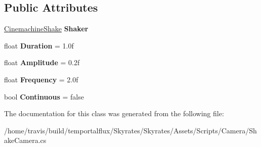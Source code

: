 \subsection*{Public Attributes}
\begin{DoxyCompactItemize}
\item 
\hypertarget{class_skyrates_1_1_cinemachine_1_1_shake_camera_a939864f39c7e4a3e9005db8f09e441dc}{\hyperlink{class_skyrates_1_1_cinemachine_1_1_cinemachine_shake}{Cinemachine\-Shake} {\bfseries Shaker}}\label{class_skyrates_1_1_cinemachine_1_1_shake_camera_a939864f39c7e4a3e9005db8f09e441dc}

\item 
\hypertarget{class_skyrates_1_1_cinemachine_1_1_shake_camera_a47fc1605072365474bf3a9371d95a654}{float {\bfseries Duration} = 1.\-0f}\label{class_skyrates_1_1_cinemachine_1_1_shake_camera_a47fc1605072365474bf3a9371d95a654}

\item 
\hypertarget{class_skyrates_1_1_cinemachine_1_1_shake_camera_a166effb0f039a292ef6a9893cb064fe8}{float {\bfseries Amplitude} = 0.\-2f}\label{class_skyrates_1_1_cinemachine_1_1_shake_camera_a166effb0f039a292ef6a9893cb064fe8}

\item 
\hypertarget{class_skyrates_1_1_cinemachine_1_1_shake_camera_a1a49598bca7c1b61c3a43e487b751e14}{float {\bfseries Frequency} = 2.\-0f}\label{class_skyrates_1_1_cinemachine_1_1_shake_camera_a1a49598bca7c1b61c3a43e487b751e14}

\item 
\hypertarget{class_skyrates_1_1_cinemachine_1_1_shake_camera_a362a9dbab92360bb938ae2fa78c66f3d}{bool {\bfseries Continuous} = false}\label{class_skyrates_1_1_cinemachine_1_1_shake_camera_a362a9dbab92360bb938ae2fa78c66f3d}

\end{DoxyCompactItemize}


The documentation for this class was generated from the following file\-:\begin{DoxyCompactItemize}
\item 
/home/travis/build/temportalflux/\-Skyrates/\-Skyrates/\-Assets/\-Scripts/\-Camera/Shake\-Camera.\-cs\end{DoxyCompactItemize}
